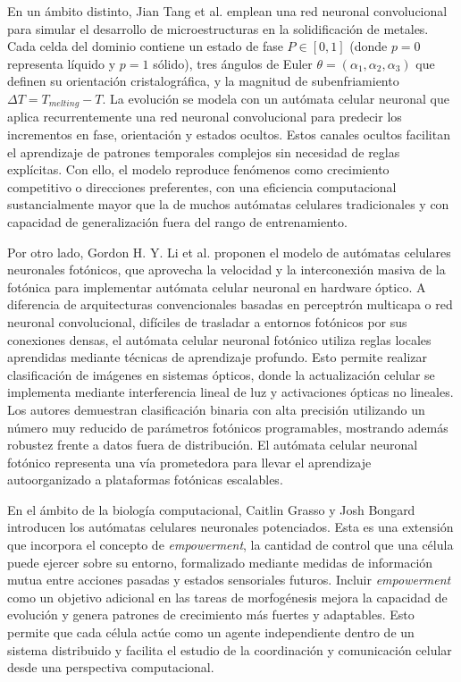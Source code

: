 En un ámbito distinto, Jian Tang et al. \cite{JianNCA} emplean una red neuronal convolucional para simular el desarrollo de microestructuras en la solidificación de metales. Cada celda del dominio contiene un estado de fase $P\in[0,1]$ (donde $p=0$ representa líquido y $p=1$ sólido), tres ángulos de Euler $\theta=(\alpha_1,\alpha_2,\alpha_3)$ que definen su orientación cristalográfica, y la magnitud de subenfriamiento $\Delta T=T_{melting}-T$. La evolución se modela con un autómata celular neuronal que aplica recurrentemente una red neuronal convolucional para predecir los incrementos en fase, orientación y estados ocultos. Estos canales ocultos facilitan el aprendizaje de patrones temporales complejos sin necesidad de reglas explícitas. Con ello, el modelo reproduce fenómenos como crecimiento competitivo o direcciones preferentes, con una eficiencia computacional sustancialmente mayor que la de muchos autómatas celulares tradicionales y con capacidad de generalización fuera del rango de entrenamiento.

Por otro lado, Gordon H. Y. Li et al. \cite{PNCA} proponen el modelo de autómatas celulares neuronales fotónicos, que aprovecha la velocidad y la interconexión masiva de la fotónica para implementar autómata celular neuronal en hardware óptico. A diferencia de arquitecturas convencionales basadas en perceptrón multicapa o red neuronal convolucional, difíciles de trasladar a entornos fotónicos por sus conexiones densas, el autómata celular neuronal fotónico utiliza reglas locales aprendidas mediante técnicas de aprendizaje profundo. Esto permite realizar clasificación de imágenes en sistemas ópticos, donde la actualización celular se implementa mediante interferencia lineal de luz y activaciones ópticas no lineales. Los autores demuestran clasificación binaria con alta precisión utilizando un número muy reducido de parámetros fotónicos programables, mostrando además robustez frente a datos fuera de distribución. El autómata celular neuronal fotónico representa una vía prometedora para llevar el aprendizaje autoorganizado a plataformas fotónicas escalables.

En el ámbito de la biología computacional, Caitlin Grasso y Josh Bongard \cite{ENCA} introducen los autómatas celulares neuronales potenciados. Esta es una extensión que incorpora el concepto de \textit{empowerment}, la cantidad de control que una célula puede ejercer sobre su entorno, formalizado mediante medidas de información mutua entre acciones pasadas y estados sensoriales futuros. Incluir \textit{empowerment} como un objetivo adicional en las tareas de morfogénesis mejora la capacidad de evolución y genera patrones de crecimiento más fuertes y adaptables. Esto permite que cada célula actúe como un agente independiente dentro de un sistema distribuido y facilita el estudio de la coordinación y comunicación celular desde una perspectiva computacional.

